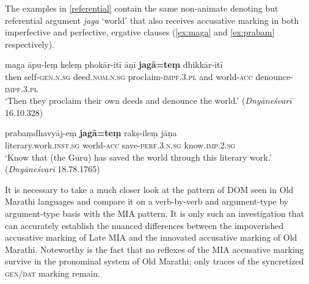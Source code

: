 \documentclass[output=paper,
modfonts
]{LSP/langsci}
\begin{document}
 The examples in \cref{referential} contain the same non-animate denoting but referential argument \textit{jaga} `world'  that also receives accusative marking in both imperfective and perfective, ergative clauses (\cref{ex:maga} and \cref{ex:prabam} respectively). 
 
\begin{exe}
	\ex\label{referential} 
	\begin{xlist}
	\ex\label{ex:maga}\gll maga āpu-leṃ keleṃ phokār-itī āṇī  \textbf{jagā=teṃ} dhikkār-itī  \\
	then self-\textsc{gen.n.sg} deed.\textsc{nom.n.sg} proclaim-\textsc{impf.3.pl} and world-\textsc{acc} denounce-\textsc{impf.3.pl} \\
	\glt `Then they proclaim their own deeds and denounce the world.' (\textit{Dnyāneśvarī} 16.10.328)
	
	\ex\label{ex:prabam}\gll prabaṃdhavyāj-eṃ \textbf{jagā=teṃ}
rakṣ-ileṃ jāṇa \\
literary.work.\textsc{inst.sg} world-\textsc{acc} save-\textsc{perf.3.n.sg} know.\textsc{imp.2.sg} \\
\glt `Know that (the Guru) has saved the world through this literary work.'  (\textit{Dnyāneśvarī} 18.78.1765)
\end{xlist}
\end{exe}

 It is necessary to take a much closer  look at the pattern of DOM seen in Old Marathi  languages and compare it on a verb-by-verb and argument-type by argument-type basis with the MIA pattern. It is only such an investigation that can accurately establish the nuanced differences   between the impoverished accusative marking of Late MIA and the innovated accusative marking of  Old Marathi. Noteworthy is the fact that no reflexes of the MIA accusative marking survive in  the pronominal system  of Old Marathi; only traces of the syncretized \textsc{gen/dat} marking remain.
 

 
\end{document}

